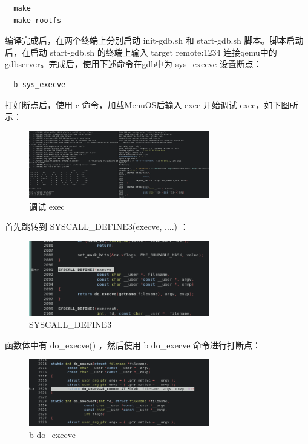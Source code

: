 \documentclass[lang=cn,10pt]{elegantbook}
\begin{document}
\begin{lstlisting}
  make
  make rootfs
\end{lstlisting}
编译完成后，在两个终端上分别启动 init-gdb.sh 和 start-gdb.sh 脚本。脚本启动后，在启动 start-gdb.sh 的终端上输入 target remote:1234 连接qemu中的gdbserver。完成后，使用下述命令在gdb中为 sys\_execve 设置断点：


\begin{lstlisting}
  b sys_execve
\end{lstlisting}

\newpage
打好断点后，使用 c 命令，加载MenuOS后输入 exec 开始调试 exec，如下图所示：
\begin{figure}[htbp]
  \centering
  \includegraphics[width=0.7\textwidth]{image/image-20231109163507762.png}
  \caption{调试 exec}
\end{figure}


首先跳转到 SYSCALL\_DEFINE3(execve, ....) ：
\begin{figure}[htbp]
  \centering
  \includegraphics[width=0.7\textwidth]{image/image-20231109164518819.png}
  \caption{SYSCALL\_DEFINE3}
\end{figure}


函数体中有 do\_execve()  ，然后使用 b do\_execve 命令进行打断点：
\begin{figure}[htbp]
  \centering
  \includegraphics[width=0.7\textwidth]{image/image-20231109165602046.png}
  \caption{b do\_execve }
\end{figure}
\end{document}
